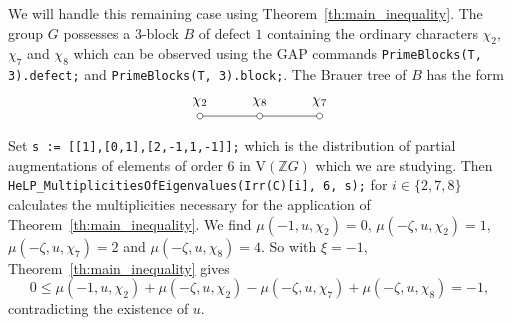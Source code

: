 \documentclass[10pt,a4paper,reqno]{amsart}
\theoremstyle{definition}
\theoremstyle{remark}
\newcommand{\V}{\mathrm{V}}
\newcommand{\ZZ}{\mathbb{Z}}
\begin{document}
{We will handle this remaining case using Theorem~\ref{th:main_inequality}. The group $G$ possesses a $3$-block $B$ of defect $1$ containing the ordinary characters $\chi_2$, $\chi_7$ and $\chi_8$ which can be observed using the \textsf{GAP} commands \texttt{PrimeBlocks(T, 3).defect;} and \texttt{PrimeBlocks(T, 3).block;}. The Brauer tree of $B$ has the form
\[
\begin{tikzpicture}
\node[label=north:{$\chi_2$}] at (0,1.5) (1){};
\node[label=north:{$\chi_8$}] at (1.5,1.5) (2){};
\node[label=north:{$\chi_7$}] at (3,1.5) (3){};
\foreach \p in {1,2,3}{
\draw[fill=white] (\p) circle (.075cm);
}
\draw (.075,1.5)--(1.425,1.5);
\draw (1.575,1.5)--(2.925,1.5);
\end{tikzpicture}
\] 
Set \texttt{s := [[1],[0,1],[2,-1,1,-1]];} which is the distribution of partial augmentations of elements of order $6$ in $\V(\ZZ G)$ which we are studying. Then \texttt{HeLP\_MultiplicitiesOfEigenvalues(Irr(C)[i], 6, s);} for $i \in \{2,7,8\}$ calculates the multiplicities necessary for the application of Theorem~\ref{th:main_inequality}. We find $\mu(-1, u, \chi_2) = 0$, $\mu(-\zeta, u, \chi_2) = 1$, $\mu(-\zeta, u, \chi_7) = 2$ and $\mu(-\zeta, u, \chi_8) = 4$. So with $\xi = -1$, Theorem~\ref{th:main_inequality} gives
$$0 \leqslant \mu(-1, u, \chi_2)  + \mu(-\zeta, u, \chi_2) - \mu(-\zeta, u, \chi_7) + \mu(-\zeta, u, \chi_8) = -1, $$
contradicting the existence of $u$.

}
\end{document}
